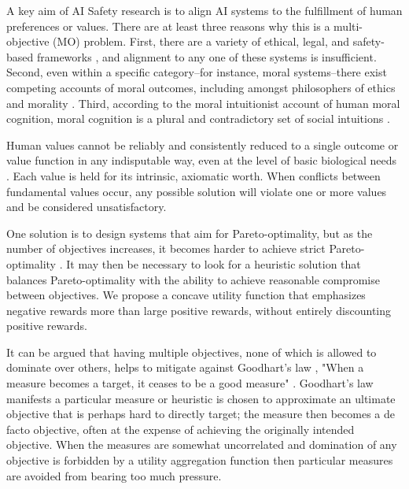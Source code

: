 

A key aim of AI Safety research is to align AI systems to the fulfillment of human preferences \cite{Bostrom2014, russell2019human} or values. There are at least three reasons why this is a multi-objective (MO) problem. First, there are a variety of ethical, legal, and safety-based frameworks \cite{vamplew_human-aligned_2018}, and alignment to any one of these systems is insufficient. Second, even within a specific category--for instance, moral systems--there exist competing accounts of moral outcomes, including amongst philosophers of ethics and morality \cite{bogosian_implementation_2017}. Third, according to the moral intuitionist account of human moral cognition, moral cognition is a plural and contradictory set of social intuitions \cite{haidt2001emotional,sotala2016defining}.

Human values cannot be reliably and consistently reduced to a single outcome or value function in any indisputable way, even at the level of basic biological needs \cite{smith2021multiattributemodel}. Each value is held for its intrinsic, axiomatic worth. When conflicts between fundamental values occur, any possible solution will violate one or more values and be considered unsatisfactory.  

One solution is to design systems that aim for Pareto-optimality, but as the number of objectives increases, it becomes harder to achieve strict Pareto-optimality \cite{rolf_need_2020}. It may then be necessary to look for a heuristic solution that balances Pareto-optimality with the ability to achieve reasonable compromise between objectives. We propose a concave utility function that emphasizes negative rewards more than large positive rewards, without entirely discounting positive rewards. %

It can be argued that having multiple objectives, none of which is allowed to dominate over others, helps to mitigate against Goodhart's law \cite{garrabrant_2017}, "When a measure becomes a target, it ceases to be a good measure" \cite{strathern1997improving}. Goodhart's law manifests a particular measure or heuristic is chosen to approximate an ultimate objective that is perhaps hard to directly target; the measure then becomes a de facto objective, often at the expense of achieving the originally intended objective. When the measures are somewhat uncorrelated and domination of any objective is forbidden by a utility aggregation function then particular measures are avoided from bearing too much pressure.

